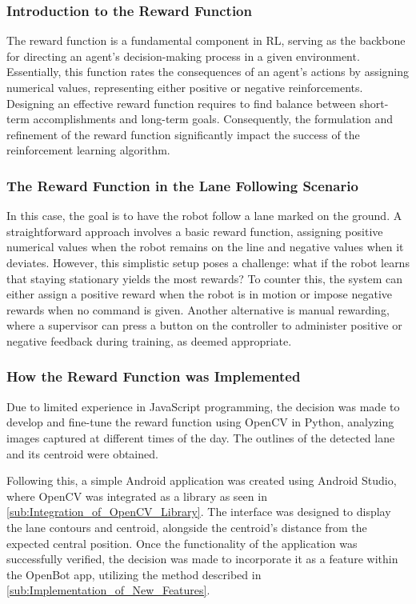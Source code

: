 \documentclass[12pt]{report}
\begin{document}
\subsubsection{Introduction to the Reward Function}
The reward function is a fundamental component in RL, serving as the backbone for directing an agent's decision-making process in a given environment. Essentially, this function rates the consequences of an agent's actions by assigning numerical values, representing either positive or negative reinforcements.
Designing an effective reward function requires to find balance between short-term accomplishments and long-term goals. Consequently, the formulation and refinement of the reward function significantly impact the success of the reinforcement learning algorithm. 


\subsubsection{The Reward Function in the Lane Following Scenario}
In this case, the goal is to have the robot follow a lane marked on the ground. A straightforward approach involves a basic reward function, assigning positive numerical values when the robot remains on the line and negative values when it deviates. However, this simplistic setup poses a challenge: what if the robot learns that staying stationary yields the most rewards? To counter this, the system can either assign a positive reward when the robot is in motion or impose negative rewards when no command is given. Another alternative is manual rewarding, where a supervisor can press a button on the controller to administer positive or negative feedback during training, as deemed appropriate.


\subsubsection{How the Reward Function was Implemented}
Due to limited experience in JavaScript programming, the decision was made to develop and fine-tune the reward function using OpenCV in Python, analyzing images captured at different times of the day. The outlines of the detected lane and its centroid were obtained.


Following this, a simple Android application was created using Android Studio, where OpenCV was integrated as a library as seen in \ref{sub:Integration_of_OpenCV_Library}. The interface was designed to display the lane contours and centroid, alongside the centroid's distance from the expected central position. Once the functionality of the application was successfully verified, the decision was made to incorporate it as a feature within the OpenBot app, utilizing the method described in \ref{sub:Implementation_of_New_Features}.
\end{document}
